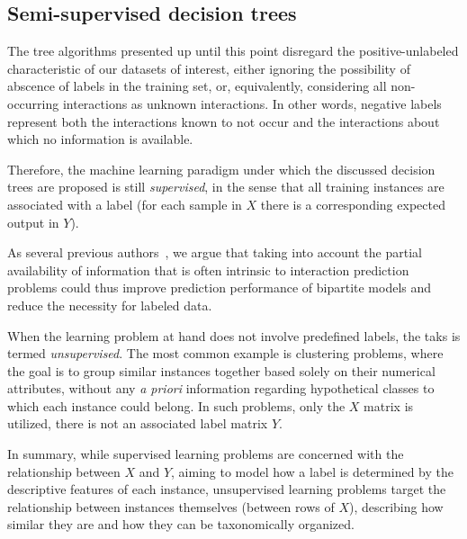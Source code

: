 \subsection{Semi-supervised decision trees}
\label{sec:ss trees}

The tree algorithms presented up until this point disregard the positive-unlabeled characteristic of our datasets of interest, either ignoring the possibility of abscence of labels in the training set, or, equivalently, considering all non-occurring interactions as unknown interactions.
In other words, negative labels represent both the interactions known to not occur and the interactions about which no information is available.

Therefore, the machine learning paradigm under which the discussed decision trees are proposed is still \emph{supervised}, in the sense that all training instances are associated with a label (for each sample in $X$ there is a corresponding expected output in $Y$).

As several previous authors~\cite{liu2017lpinrlmf,he2017simboost}, %
we argue that taking into account the partial availability of information that is often intrinsic to interaction prediction problems could thus improve prediction performance of bipartite models and reduce the necessity for labeled data.

When the learning problem at hand does not involve predefined labels, the taks is termed \emph{unsupervised}. The most common example is clustering problems, where the goal is to group similar instances together based solely on their numerical attributes, without any \textit{a priori} information regarding hypothetical classes to which each instance could belong. In such problems, only the $X$ matrix is utilized, there is not an associated label matrix $Y$.

In summary, while supervised learning problems are concerned with the relationship between $X$ and $Y$, aiming to model how a label is determined by the descriptive features of each instance, unsupervised learning problems target the relationship between instances themselves (between rows of $X$), describing how similar they are and how they can be taxonomically organized.

